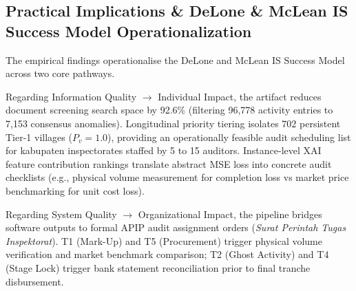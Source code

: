 \documentclass[runningheads]{llncs}
\begin{document}
\begin{table}[htbp]
\centering
\caption{Design Science Research (DSR) Evaluation Matrix for \textbf{Protocol 2} Artifact}
\label{tab:dsr_matrix}
\end{table}

\subsection{Practical Implications \& DeLone \& McLean IS Success Model Operationalization}
The empirical findings operationalise the DeLone and McLean IS Success Model~\cite{ref10} across two core pathways.

Regarding Information Quality $\to$ Individual Impact, the artifact reduces document screening search space by 92.6\% (filtering 96,778 activity entries to 7,153 consensus anomalies). Longitudinal priority tiering isolates 702 persistent Tier-1 villages ($P_v = 1.0$), providing an operationally feasible audit scheduling list for kabupaten inspectorates staffed by 5 to 15 auditors. Instance-level XAI feature contribution rankings translate abstract MSE loss into concrete audit checklists (e.g., physical volume measurement for completion loss vs market price benchmarking for unit cost loss).

Regarding System Quality $\to$ Organizational Impact, the pipeline bridges software outputs to formal APIP audit assignment orders (\textit{Surat Perintah Tugas Inspektorat}). T1 (Mark-Up) and T5 (Procurement) trigger physical volume verification and market benchmark comparison; T2 (Ghost Activity) and T4 (Stage Lock) trigger bank statement reconciliation prior to final tranche disbursement.
\end{document}
